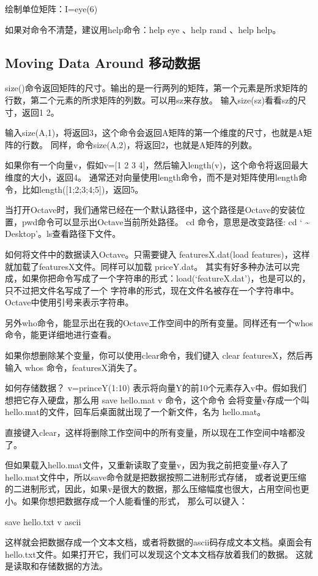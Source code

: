 \documentclass[UTF8]{ctexart}
\begin{document}
绘制单位矩阵：I=eye(6)

如果对命令不清楚，建议用help命令：help eye 、help rand 、help help。

\subsection{Moving Data Around 移动数据}
size()命令返回矩阵的尺寸。输出的是一行两列的矩阵，第一个元素是所求矩阵的行数，第二个元素的所求矩阵的列数。可以用sz来存放。
输入size(sz)看看sz的尺寸，返回1 2。

输入size(A,1)，将返回3，这个命令会返回A矩阵的第一个维度的尺寸，也就是A矩阵的行数。
同样，命令size(A,2)，将返回2，也就是A矩阵的列数。

如果你有一个向量v，假如v=[1 2 3 4]，然后输入length(v)，这个命令将返回最大维度的大小，返回4。
通常还对向量使用length命令，而不是对矩阵使用length命令，比如length([1;2;3;4;5])，返回5。

当打开Octave时，我们通常已经在一个默认路径中，这个路径是Octave的安装位置，pwd命令可以显示出Octave当前所处路径。
cd 命令，意思是改变路径: cd ` \~ \/ Desktop'。ls查看路径下文件。

如何将文件中的数据读入Octave。只需要键入 featuresX.dat(load features)，这样就加载了featuresX文件。同样可以加载 priceY.dat。
其实有好多种办法可以完成，如果你把命令写成了一个字符串的形式：load(`featureX.dat')，也是可以的，只不过把文件名写成了一个
字符串的形式，现在文件名被存在一个字符串中。Octave中使用引号来表示字符串。

另外who命令，能显示出在我的Octave工作空间中的所有变量。同样还有一个whos命令，能更详细地进行查看。

如果你想删除某个变量，你可以使用clear命令，我们键入 clear featuresX，然后再输入 whos 命令，featuresX消失了。

如何存储数据？ v=princeY(1:10) 表示将向量Y的前10个元素存入v中。假如我们想把它存入硬盘，那么用 save hello.mat v 命令，这个命令
会将变量v存成一个叫 hello.mat的文件，回车后桌面就出现了一个新文件，名为 hello.mat。

直接键入clear，这样将删除工作空间中的所有变量，所以现在工作空间中啥都没了。

但如果载入hello.mat文件，又重新读取了变量v，因为我之前把变量v存入了hello.mat文件中，所以save命令就是把数据按照二进制形式存储，
或者说更压缩的二进制形式，因此，如果v是很大的数据，那么压缩幅度也很大，占用空间也更小。如果你想把数据存成一个人能看懂的形式，
那么可以键入：

save hello.txt v \-ascii

这样就会把数据存成一个文本文档，或者将数据的ascii码存成文本文档。桌面会有hello.txt文件。如果打开它，我们可以发现这个文本文档存放着我们的数据。
这就是读取和存储数据的方法。
\end{document}
